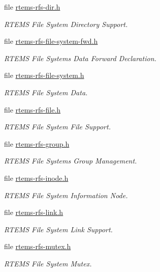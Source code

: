 \begin{DoxyCompactItemize}
file \mbox{\hyperlink{rtems-rfs-dir_8h}{rtems-\/rfs-\/dir.\+h}}
\begin{DoxyCompactList}\small\item\em R\+T\+E\+MS File System Directory Support. \end{DoxyCompactList}\item 
file \mbox{\hyperlink{rtems-rfs-file-system-fwd_8h}{rtems-\/rfs-\/file-\/system-\/fwd.\+h}}
\begin{DoxyCompactList}\small\item\em R\+T\+E\+MS File Systems Data Forward Declaration. \end{DoxyCompactList}\item 
file \mbox{\hyperlink{rtems-rfs-file-system_8h}{rtems-\/rfs-\/file-\/system.\+h}}
\begin{DoxyCompactList}\small\item\em R\+T\+E\+MS File System Data. \end{DoxyCompactList}\item 
file \mbox{\hyperlink{rtems-rfs-file_8h}{rtems-\/rfs-\/file.\+h}}
\begin{DoxyCompactList}\small\item\em R\+T\+E\+MS File System File Support. \end{DoxyCompactList}\item 
file \mbox{\hyperlink{rtems-rfs-group_8h}{rtems-\/rfs-\/group.\+h}}
\begin{DoxyCompactList}\small\item\em R\+T\+E\+MS File Systems Group Management. \end{DoxyCompactList}\item 
file \mbox{\hyperlink{rtems-rfs-inode_8h}{rtems-\/rfs-\/inode.\+h}}
\begin{DoxyCompactList}\small\item\em R\+T\+E\+MS File System Information Node. \end{DoxyCompactList}\item 
file \mbox{\hyperlink{rtems-rfs-link_8h}{rtems-\/rfs-\/link.\+h}}
\begin{DoxyCompactList}\small\item\em R\+T\+E\+MS File System Link Support. \end{DoxyCompactList}\item 
file \mbox{\hyperlink{rtems-rfs-mutex_8h}{rtems-\/rfs-\/mutex.\+h}}
\begin{DoxyCompactList}\small\item\em R\+T\+E\+MS File System Mutex. \end{DoxyCompactList}\item 

\end{DoxyCompactItemize}
